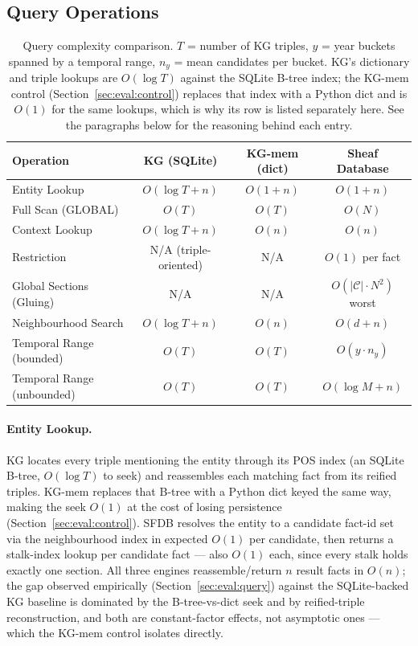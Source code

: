 \subsection{Query Operations}
\label{sec:complexity:query}

\begin{table}[ht]
\centering
\caption{Query complexity comparison. $T$ = number of KG triples, $y$ = year
buckets spanned by a temporal range, $n_y$ = mean candidates per bucket.
KG's dictionary and triple lookups are $O(\log T)$ against the SQLite
B-tree index; the KG-mem control (Section~\ref{sec:eval:control}) replaces
that index with a Python dict and is $O(1)$ for the same lookups, which is
why its row is listed separately here. See the paragraphs below for the
reasoning behind each entry.}
\label{tab:complexity:query}
\begin{tabular}{@{}lccc@{}}
\toprule
Operation & KG (SQLite) & KG-mem (dict) & Sheaf Database \\
\midrule
Entity Lookup & $O(\log T + n)$ & $O(1 + n)$ & $O(1 + n)$ \\
Full Scan (GLOBAL) & $O(T)$ & $O(T)$ & $O(N)$ \\
Context Lookup & $O(\log T + n)$ & $O(n)$ & $O(n)$ \\
Restriction & N/A (triple-oriented) & N/A & $O(1)$ per fact \\
Global Sections (Gluing) & N/A & N/A & $O(|\mathcal{C}| \cdot N^2)$ worst \\
Neighbourhood Search & $O(\log T + n)$ & $O(n)$ & $O(d + n)$ \\
Temporal Range (bounded) & $O(T)$ & $O(T)$ & $O(y \cdot n_y)$ \\
Temporal Range (unbounded) & $O(T)$ & $O(T)$ & $O(\log M + n)$ \\
\bottomrule
\end{tabular}
\end{table}

\paragraph{Entity Lookup.} KG locates every triple mentioning the entity through
its POS index (an SQLite B-tree, $O(\log T)$ to seek) and reassembles each
matching fact from its reified triples. KG-mem replaces that B-tree with
a Python dict keyed the same way, making the seek $O(1)$ at the cost of
losing persistence (Section~\ref{sec:eval:control}). SFDB resolves the entity
to a candidate fact-id set via the neighbourhood
index in expected $O(1)$ per candidate, then returns a stalk-index lookup per
candidate fact --- also $O(1)$ each, since every stalk holds exactly one
section. All three engines reassemble/return $n$ result facts in
$O(n)$; the gap observed empirically (Section~\ref{sec:eval:query}) against
the SQLite-backed KG baseline is dominated by the B-tree-vs-dict seek and by
reified-triple reconstruction, and both are constant-factor effects, not
asymptotic ones --- which the KG-mem control isolates directly.

